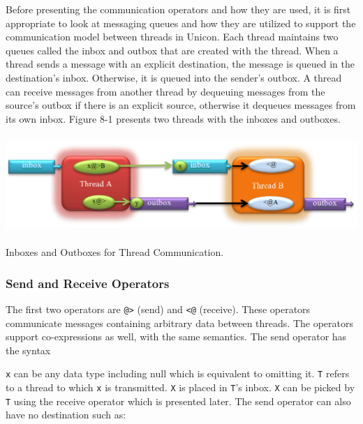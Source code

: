 Before presenting the communication operators and how they are used, it
is first appropriate to look at messaging queues and how they are
utilized to support the communication model between threads in Unicon.
Each thread maintains two queues called the inbox and outbox that are
created with the thread. When a thread sends a message with an explicit
destination, the message is queued in the destination{\textquoteright}s
inbox. Otherwise, it is queued into the sender{\textquoteright}s outbox.
A thread can receive messages from another thread by dequeuing messages
from the source{\textquoteright}s outbox if there is an explicit
source, otherwise it dequeues messages from its own inbox.  Figure 8-1
presents two threads with the inboxes and outboxes.

\bigskip


\begin{center}
\includegraphics[width=5.75in,height=1.45in]{ub-img/thread-fig1.png}
\end{center}
\vspace{-0.25cm}{\sffamily\bfseries Figure 8-1:}
{\sffamily Inboxes and Outboxes for Thread Communication.}

\bigskip

\subsubsection{Send and Receive Operators}

The first two operators are \texttt{@{\textgreater}} (send)
and \texttt{{\textless}@} (receive). These operators
communicate messages containing arbitrary data between threads. The
operators support co-expressions as well, with the same semantics. The
send operator has the syntax 


\texttt{x} can be any data type including null which is
equivalent to omitting it. \texttt{T} refers to a thread to
which \texttt{x} is transmitted. \texttt{X} is
placed in \texttt{T}{\textquoteright}s inbox.
\texttt{X} can be picked by \texttt{T} using the
receive operator which is presented later. The send operator can also
have no destination such as:

